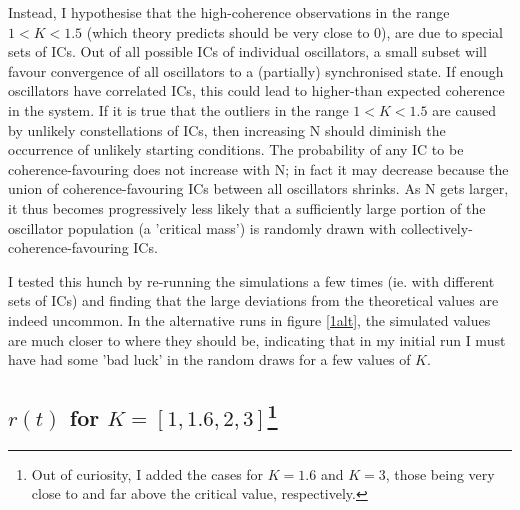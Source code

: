 \documentclass[11pt,a4paper]{article}
\newcommand{\graph}{\medskip\noindent}
\begin{document}
\graph
Instead, I hypothesise that the high-coherence observations in the range $1<K<1.5$ (which theory predicts should be very close to 0), are due to special sets of ICs. 
Out of all possible ICs of individual oscillators, a small subset will favour convergence of all oscillators to a (partially) synchronised state. 
If enough oscillators have correlated ICs, this could lead to higher-than expected coherence in the system.
If it is true that the outliers in the range $1<K<1.5$ are caused by unlikely constellations of ICs, then increasing N should diminish the occurrence of unlikely starting conditions. 
The probability of any IC to be coherence-favouring does not increase with N; in fact it may decrease because the union of coherence-favouring ICs between all oscillators shrinks.
As N gets larger, it thus becomes progressively less likely that a sufficiently large portion of the oscillator population (a 'critical mass') is randomly drawn with collectively-coherence-favouring ICs.


I tested this hunch by re-running the simulations a few times (ie. with different sets of ICs) and finding that the large deviations from the theoretical values are indeed uncommon. 
In the alternative runs in figure \ref{1alt}, the simulated values are much closer to where they should be, indicating that in my initial run I must have had some 'bad luck' in the random draws for a few values of $K$.








\subsection{$r(t)$ for $K = [1, 1.6, 2, 3]$\footnote{Out of curiosity, I added the cases for $K=1.6$ and $K=3$, those being very close to and far above the critical value, respectively.}}  
\label{r(t)}
\end{document}
